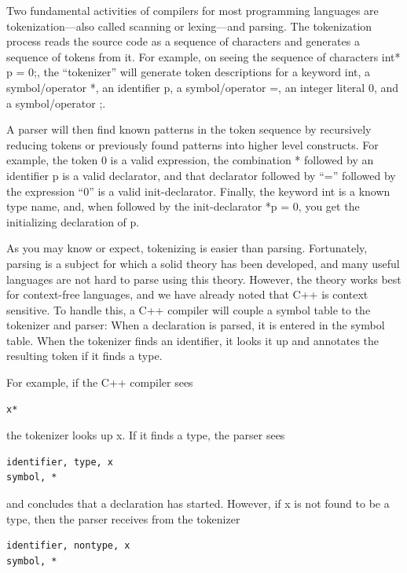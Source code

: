
Two fundamental activities of compilers for most programming languages are tokenization—also called scanning or lexing—and parsing. The tokenization process reads the source code as a sequence of characters and generates a sequence of tokens from it. For example, on seeing the sequence of characters int* p = 0;, the “tokenizer” will generate token descriptions for a keyword int, a symbol/operator *, an identifier p, a symbol/operator =, an integer literal 0, and a symbol/operator ;.

A parser will then find known patterns in the token sequence by recursively reducing tokens or previously found patterns into higher level constructs. For example, the token 0 is a valid expression, the combination * followed by an identifier p is a valid declarator, and that declarator followed by “=” followed by the expression “0” is a valid init-declarator. Finally, the keyword int is a known type name, and, when followed by the init-declarator *p = 0, you get the initializing declaration of p.


As you may know or expect, tokenizing is easier than parsing. Fortunately, parsing is a subject for which a solid theory has been developed, and many useful languages are not hard to parse using this theory. However, the theory works best for context-free languages, and we have already noted that C++ is context sensitive. To handle this, a C++ compiler will couple a symbol table to the tokenizer and parser: When a declaration is parsed, it is entered in the symbol table. When the tokenizer finds an identifier, it looks it up and annotates the resulting token if it finds a type. 

For example, if the C++ compiler sees

\begin{lstlisting}[style=styleCXX]
x*
\end{lstlisting}

the tokenizer looks up x. If it finds a type, the parser sees

\begin{lstlisting}[style=styleCXX]
identifier, type, x
symbol, *
\end{lstlisting}

and concludes that a declaration has started. However, if x is not found to be a type, then the parser receives from the tokenizer

\begin{lstlisting}[style=styleCXX]
identifier, nontype, x
symbol, *
\end{lstlisting}

